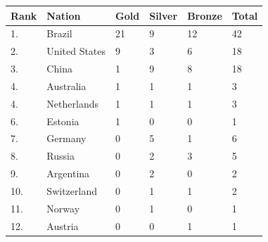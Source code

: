 \documentclass{article}
\begin{document}
\begin{tabular}{llllll}
\toprule
Rank & Nation & Gold & Silver & Bronze & Total \\
\midrule
1. & Brazil & 21 & 9 & 12 & 42 \\
2. & United States & 9 & 3 & 6 & 18 \\
3. & China & 1 & 9 & 8 & 18 \\
4. & Australia & 1 & 1 & 1 & 3 \\
4. & Netherlands & 1 & 1 & 1 & 3 \\
6. & Estonia & 1 & 0 & 0 & 1 \\
7. & Germany & 0 & 5 & 1 & 6 \\
8. & Russia & 0 & 2 & 3 & 5 \\
9. & Argentina & 0 & 2 & 0 & 2 \\
10. & Switzerland & 0 & 1 & 1 & 2 \\
11. & Norway & 0 & 1 & 0 & 1 \\
12. & Austria & 0 & 0 & 1 & 1 \\
\bottomrule
\end{tabular}
\end{document}
